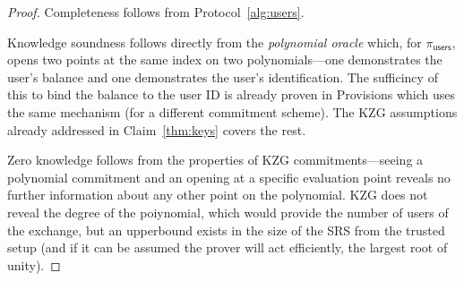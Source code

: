 \begin{proof}
Completeness follows from Protocol~\ref{alg:users}. 

Knowledge soundness follows directly from the \textit{polynomial oracle} which, for $\pi_\mathsf{users}$, opens two points at the same index on two polynomials---one demonstrates the user's balance and one demonstrates the user's identification. The sufficincy of this to bind the balance to the user ID is already proven in Provisions which uses the same mechanism (for a different commitment scheme). The KZG assumptions already addressed in Claim~\ref{thm:keys} covers the rest. 

Zero knowledge follows from the properties of KZG commitments---seeing a polynomial commitment and an opening at a specific evaluation point reveals no further information about any other point on the polynomial. KZG does not reveal the degree of the poiynomial, which would provide the number of users of the exchange, but an upperbound exists in the size of the SRS from the trusted setup (and if it can be assumed the prover will act efficiently, the largest root of unity). \end{proof}
